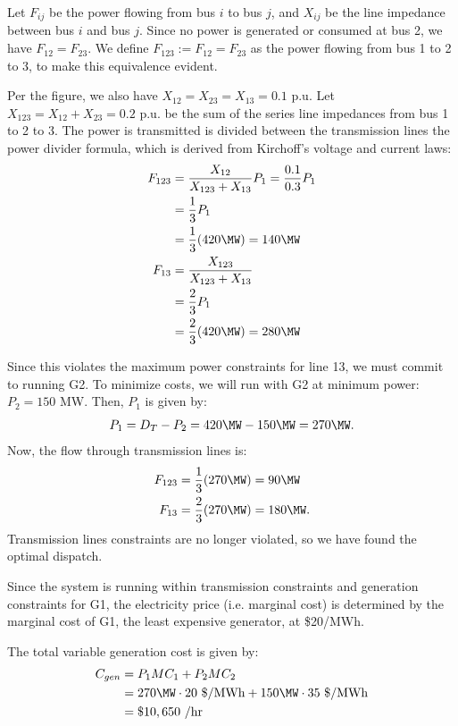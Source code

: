 \documentclass{homework}
\begin{document}
\begin{letterenum}
\begin{letterenum}
Let $F_{ij}$ be the power flowing from bus $i$ to bus $j$, and $X_{ij}$ be the line impedance
between bus $i$ and bus $j$. Since no power is generated or consumed at bus 2, we have
$F_{12} = F_{23}$. We define $F_{123} := F_{12} = F_{23}$ as the power flowing
from bus 1 to 2 to 3, to make this equivalence
evident.

Per the figure, we also have
$X_{12} = X_{23} = X_{13} = 0.1$ p.u. Let $X_{123} = X_{12} + X_{23} = 0.2$ p.u.
be the sum of the series line impedances from bus 1 to 2 to 3.
The power is transmitted is divided between the 
transmission lines the power divider formula, which is derived from
Kirchoff's voltage and current laws:
\begin{align*}
    F_{123} &= \frac{X_{12}}{X_{123} + X_{13}} P_1 = \frac{0.1}{0.3} P_1 \\
        &= \frac{1}{3} P_1 \\
        &= \frac{1}{3} (420 \MW) = 140 \MW \\
    F_{13} &= \frac{X_{123}}{X_{123} + X_{13}} \\
        &= \frac{2}{3} P_1 \\
        &= \frac{2}{3} (420 \MW) = 280 \MW
\end{align*}

Since this violates the maximum power constraints for line 13, we must commit
to running G2. To minimize costs, we will run with G2 at minimum power:
$P_2 = 150$ MW. Then, $P_1$ is given by:
\begin{equation*}
    P_1 = D_T - P_2 = 420 \MW - 150 \MW = 270 \MW.
\end{equation*}
Now, the flow through transmission lines is:
\begin{align*}
    F_{123} &= \frac{1}{3} (270 \MW) = 90 \MW \\
    F_{13} &= \frac{2}{3} (270 \MW) = 180 \MW.
\end{align*}
Transmission lines constraints are no longer violated, so we have found the
optimal dispatch.

\item Since the system is running within transmission constraints and generation
constraints for G1, the electricity price (i.e.
marginal cost) is determined by the marginal cost of G1, the least expensive generator,
at \$20/MWh.

\item The total variable generation cost is given by:
\begin{align*}
    C_{gen} &= P_1 MC_1 + P_2 MC_2 \\
        &= 270 \MW \cdot 20 \dolperMWh + 150 \MW \cdot 35 \dolperMWh \\
        &= \$ 10,650 \perh
\end{align*}
\end{letterenum}


\end{letterenum}
\end{document}
